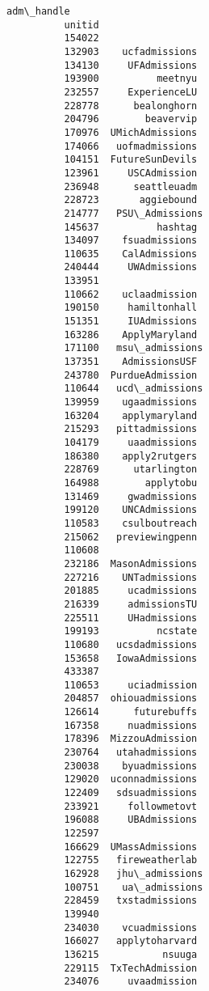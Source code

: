 \documentclass[11pt]{article}
\begin{document}
\begin{Verbatim}[commandchars=\\\{\}]
                       adm\_handle  
          unitid                   
          154022                   
          132903    ucfadmissions  
          134130     UFAdmissions  
          193900          meetnyu  
          232557     ExperienceLU  
          228778      bealonghorn  
          204796        beavervip  
          170976  UMichAdmissions  
          174066   uofmadmissions  
          104151  FutureSunDevils  
          123961     USCAdmission  
          236948      seattleuadm  
          228723       aggiebound  
          214777   PSU\_Admissions  
          145637          hashtag  
          134097    fsuadmissions  
          110635    CalAdmissions  
          240444     UWAdmissions  
          133951                   
          110662    uclaadmission  
          190150     hamiltonhall  
          151351     IUAdmissions  
          163286    ApplyMaryland  
          171100   msu\_admissions  
          137351    AdmissionsUSF  
          243780  PurdueAdmission  
          110644   ucd\_admissions  
          139959    ugaadmissions  
          163204    applymaryland  
          215293   pittadmissions  
          104179     uaadmissions  
          186380    apply2rutgers  
          228769      utarlington  
          164988        applytobu  
          131469     gwadmissions  
          199120    UNCAdmissions  
          110583    csulboutreach  
          215062   previewingpenn  
          110608                   
          232186  MasonAdmissions  
          227216    UNTadmissions  
          201885     ucadmissions  
          216339     admissionsTU  
          225511     UHadmissions  
          199193          ncstate  
          110680   ucsdadmissions  
          153658   IowaAdmissions  
          433387                   
          110653     uciadmission  
          204857  ohiouadmissions  
          126614      futurebuffs  
          167358     nuadmissions  
          178396  MizzouAdmission  
          230764   utahadmissions  
          230038    byuadmissions  
          129020  uconnadmissions  
          122409   sdsuadmissions  
          233921     followmetovt  
          196088     UBAdmissions  
          122597                   
          166629  UMassAdmissions  
          122755   fireweatherlab  
          162928   jhu\_admissions  
          100751    ua\_admissions  
          228459   txstadmissions  
          139940                   
          234030    vcuadmissions  
          166027   applytoharvard  
          136215           nsuuga  
          229115  TxTechAdmission  
          234076     uvaadmission  

\end{Verbatim}
\end{document}
